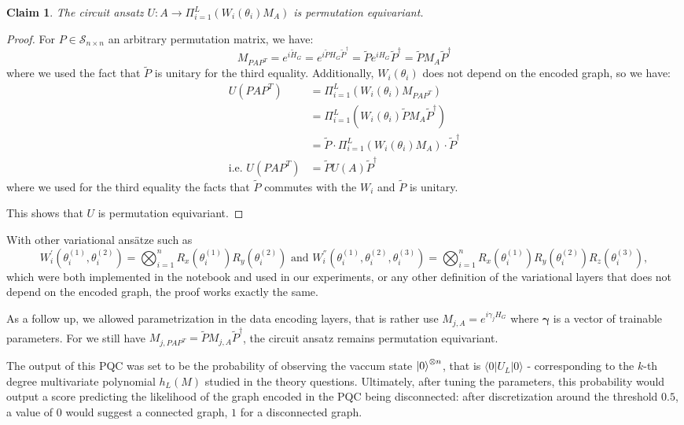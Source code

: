 \documentclass{article}
\theoremstyle{definition}
\theoremstyle{plain}
\newtheorem{claim}{Claim}
\begin{document}
\begin{claim} The circuit ansatz $U : A \rightarrow \Pi_{i=1}^L (W_i(\theta_i)M_A)$ is permutation equivariant. \end{claim}

\begin{proof}
For $P \in \mathcal{S}_{n \times n}$ an arbitrary permutation matrix, we have:
\[ M_{PAP^T} = e^{i\tilde{H}_G} = e^{i \tilde{P} H_G \tilde{P}^{\dagger}} = \tilde{P} e^{iH_G} \tilde{P}^{\dagger} = \tilde{P} M_A \tilde{P}^{\dagger} \]
where we used the fact that $\tilde{P}$ is unitary for the third equality. Additionally, $W_i(\theta_i)$ does not depend on the encoded graph, so we have:
\begin{align*}
U(PAP^{T}) &= \Pi_{i=1}^L (W_i(\theta_i) M_{PAP^T}) \\
&= \Pi_{i=1}^L (W_i(\theta_i) \tilde{P} M_A \tilde{P}^{\dagger}) \\
&= \tilde{P} \cdot \Pi_{i=1}^L (W_i(\theta_i) M_A) \cdot \tilde{P}^{\dagger} \\
\text{i.e. } U(PAP^{T}) &= \tilde{P}U(A)\tilde{P}^{\dagger}
\end{align*}
where we used for the third equality the facts that $\tilde{P}$ commutes with the $W_i$ and $\tilde{P}$ is unitary.

This shows that $U$ is permutation equivariant.
\end{proof}

With other variational ansätze such as \[ W_i^{'}(\theta_i^{(1)},\theta_i^{(2)}) = \bigotimes_{i=1}^n R_x(\theta_i^{(1)})R_y(\theta_i^{(2)}) \text{ and } W_i^{''}(\theta_i^{(1)},\theta_i^{(2)},\theta_i^{(3)}) = \bigotimes_{i=1}^n R_x(\theta_i^{(1)})R_y(\theta_i^{(2)})R_z(\theta_i^{(3)}), \] which were both implemented in the notebook and used in our experiments, or any other definition of the variational layers that does not depend on the encoded graph, the proof works exactly the same.

As a follow up, we allowed parametrization in the data encoding layers, that is rather use $M_{j,A} = e^{i\gamma_jH_G}$ where $\boldsymbol{\gamma}$ is a vector of trainable parameters. For we still have $M_{j, PAP^T} = \tilde{P} M_{j,A} \tilde{P}^{\dagger}$, the circuit ansatz remains permutation equivariant.

The output of this PQC was set to be the probability of observing the vaccum state $\ket{0}^{\otimes n}$, that is $\langle 0 | U_L | 0 \rangle$ - corresponding to the $k$-th degree multivariate polynomial $h_L(M)$ studied in the theory questions. Ultimately, after tuning the parameters, this probability would output a score predicting the likelihood of the graph encoded in the PQC being disconnected: after discretization around the threshold $0.5$, a value of $0$ would suggest a connected graph, $1$ for a disconnected graph.
\end{document}
